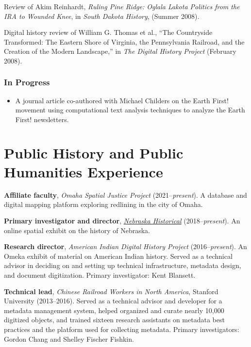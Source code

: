 Review of Akim Reinhardt, \emph{Ruling Pine Ridge: Oglala Lakota
Politics from the IRA to Wounded Knee}, in \emph{South Dakota History},
(Summer 2008).

Digital history review of William G. Thomas et al., ``The Countryside
Transformed: The Eastern Shore of Virginia, the Pennsylvania Railroad,
and the Creation of the Modern Landscape,'' in \emph{The Digital History
Project} (February 2008).

\subsubsection{In Progress}\label{in-progress}

\begin{itemize}
\tightlist
\item
  A journal article co-authored with Michael Childers on the Earth
  First! movement using computational text analysis techniques to
  analyze the Earth First! newsletters.
\end{itemize}

\section{Public History and Public Humanities
Experience}\label{public-history-and-public-humanities-experience}

\textbf{Affiliate faculty}, \emph{Omaha Spatial Justice Project}
(2021--\emph{present}). A database and digital mapping platform
exploring redlining in the city of Omaha.

\textbf{Primary investigator and director},
\emph{\href{http://svhistorical.org}{Nebraska Historical}}
(2018--\emph{present}). An online spatial exhibit on the history of
Nebraska.

\textbf{Research director}, \emph{American Indian Digital History
Project} (2016--\emph{present}). An Omeka exhibit of material on
American Indian history. Served as a technical advisor in deciding on
and setting up technical infrastructure, metadata design, and document
digitization. Primary investigator: Kent Blansett.

\textbf{Technical lead}, \emph{Chinese Railroad Workers in North
America}, Stanford University (2013--2016). Served as a technical
advisor and developer for a metadata management system, helped organized
and curate nearly 10,000 digitized objects, and trained sixteen research
assistants on metadata best practices and the platform used for
collecting metadata. Primary investigators: Gordon Chang and Shelley
Fischer Fishkin.

